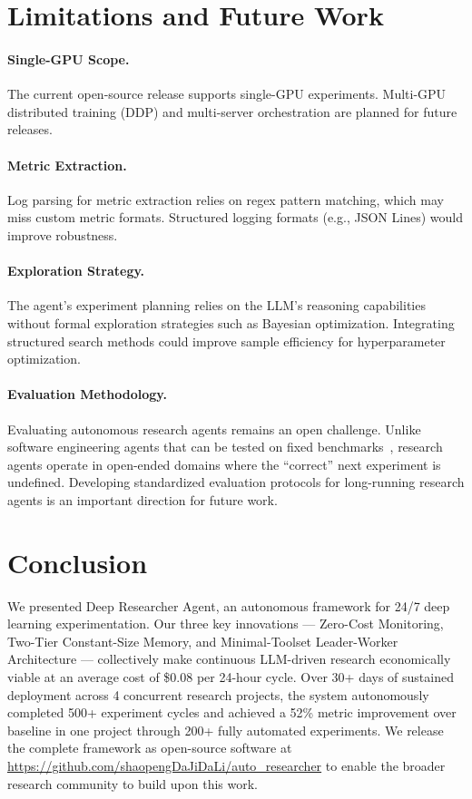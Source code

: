 \section{Limitations and Future Work}
\label{sec:limitations}

\paragraph{Single-GPU Scope.} The current open-source release supports single-GPU experiments. Multi-GPU distributed training (DDP) and multi-server orchestration are planned for future releases.

\paragraph{Metric Extraction.} Log parsing for metric extraction relies on regex pattern matching, which may miss custom metric formats. Structured logging formats (e.g., JSON Lines) would improve robustness.

\paragraph{Exploration Strategy.} The agent's experiment planning relies on the LLM's reasoning capabilities without formal exploration strategies such as Bayesian optimization. Integrating structured search methods could improve sample efficiency for hyperparameter optimization.

\paragraph{Evaluation Methodology.} Evaluating autonomous research agents remains an open challenge. Unlike software engineering agents that can be tested on fixed benchmarks~\cite{swe-agent}, research agents operate in open-ended domains where the ``correct'' next experiment is undefined. Developing standardized evaluation protocols for long-running research agents is an important direction for future work.

\section{Conclusion}
\label{sec:conclusion}

We presented Deep Researcher Agent, an autonomous framework for 24/7 deep learning experimentation. Our three key innovations --- Zero-Cost Monitoring, Two-Tier Constant-Size Memory, and Minimal-Toolset Leader-Worker Architecture --- collectively make continuous LLM-driven research economically viable at an average cost of \$0.08 per 24-hour cycle. Over 30+ days of sustained deployment across 4 concurrent research projects, the system autonomously completed 500+ experiment cycles and achieved a 52\% metric improvement over baseline in one project through 200+ fully automated experiments. We release the complete framework as open-source software at \url{https://github.com/shaopengDaJiDaLi/auto_researcher} to enable the broader research community to build upon this work.
